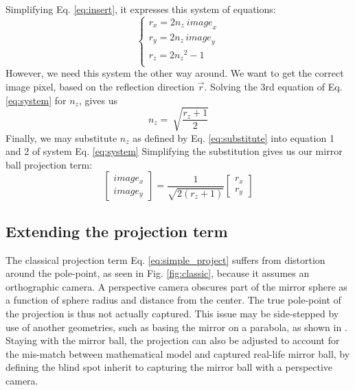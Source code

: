 \documentclass[10pt]{article}
\begin{document}
\begin{multicols}{2}
\begin{equation}
	\end{equation}
	Simplifying Eq. \ref{eq:insert}, it expresses this system of equations:
	\begin{equation}\label{eq:system}
		\left\{\begin{matrix}r_x=2n_z\ {image}_x\\r_y=2n_{z\ }{image}_y\\r_z=2{n_z}^2-1\ \ \ \ \ \\\end{matrix}\right.
	\end{equation}
	However, we need this system the other way around. We want to get the correct image pixel, based on the reflection direction $\vec{r}$. Solving the 3rd equation of Eq. \ref{eq:system} for $n_z$, gives us
	\begin{equation}\label{eq:substitute}
		n_z=\ \sqrt{\frac{r_z+1}{2}}
	\end{equation}
	Finally, we may substitute $n_z$ as defined by Eq. \ref{eq:substitute} into equation 1 and 2 of system Eq. \ref{eq:system} Simplifying the substitution gives us our mirror ball projection term:
	\begin{equation}\label{eq:simple_project}
		\begin{bmatrix} image_x \\ image_y \end{bmatrix}=\frac{1}{\sqrt{2(r_z+1)}}\begin{bmatrix} r_x \\ r_y \end{bmatrix}
	\end{equation}

	\subsection{Extending the projection term}
	The classical projection term Eq. \ref{eq:simple_project} suffers from distortion around the pole-point, as seen in Fig. \ref{fig:classic}, because it assumes an orthographic camera. A perspective camera obscures part of the mirror sphere as a function of sphere radius and distance from the center. The true pole-point of the projection is thus not actually captured. This issue may be side-stepped by use of another geometries, such as basing the mirror on a parabola, as shown in \cite{hyperbolic}. Staying with the mirror ball, the projection can also be adjusted to account for the mis-match between mathematical model and captured real-life mirror ball, by defining the blind spot inherit to capturing the mirror ball with a perspective camera.


\end{multicols}
\end{document}
